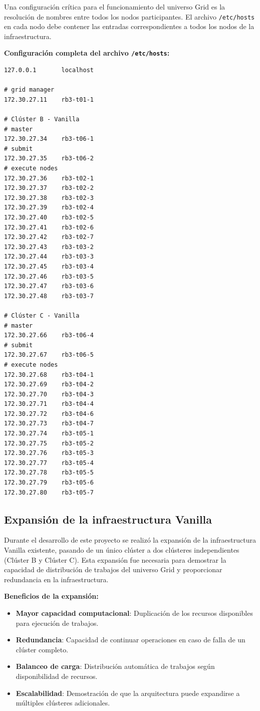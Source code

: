 Una configuración crítica para el funcionamiento del universo Grid es la resolución de nombres entre todos los nodos participantes. El archivo \texttt{/etc/hosts} en cada nodo debe contener las entradas correspondientes a todos los nodos de la infraestructura.

\textbf{Configuración completa del archivo \texttt{/etc/hosts}:}

\begin{verbatim}
127.0.0.1       localhost

# grid manager
172.30.27.11    rb3-t01-1

# Clúster B - Vanilla
# master
172.30.27.34    rb3-t06-1
# submit
172.30.27.35    rb3-t06-2
# execute nodes
172.30.27.36    rb3-t02-1
172.30.27.37    rb3-t02-2
172.30.27.38    rb3-t02-3
172.30.27.39    rb3-t02-4
172.30.27.40    rb3-t02-5
172.30.27.41    rb3-t02-6
172.30.27.42    rb3-t02-7
172.30.27.43    rb3-t03-2
172.30.27.44    rb3-t03-3
172.30.27.45    rb3-t03-4
172.30.27.46    rb3-t03-5
172.30.27.47    rb3-t03-6
172.30.27.48    rb3-t03-7

# Clúster C - Vanilla
# master
172.30.27.66    rb3-t06-4
# submit
172.30.27.67    rb3-t06-5
# execute nodes
172.30.27.68    rb3-t04-1
172.30.27.69    rb3-t04-2
172.30.27.70    rb3-t04-3
172.30.27.71    rb3-t04-4
172.30.27.72    rb3-t04-6
172.30.27.73    rb3-t04-7
172.30.27.74    rb3-t05-1
172.30.27.75    rb3-t05-2
172.30.27.76    rb3-t05-3
172.30.27.77    rb3-t05-4
172.30.27.78    rb3-t05-5
172.30.27.79    rb3-t05-6
172.30.27.80    rb3-t05-7
\end{verbatim}

\FloatBarrier\subsection{Expansión de la infraestructura Vanilla}

Durante el desarrollo de este proyecto se realizó la expansión de la infraestructura Vanilla existente, pasando de un único clúster a dos clústeres independientes (Clúster B y Clúster C). Esta expansión fue necesaria para demostrar la capacidad de distribución de trabajos del universo Grid y proporcionar redundancia en la infraestructura.

\textbf{Beneficios de la expansión:}

\begin{itemize}
	\item \textbf{Mayor capacidad computacional}: Duplicación de los recursos disponibles para ejecución de trabajos.
	
	\item \textbf{Redundancia}: Capacidad de continuar operaciones en caso de falla de un clúster completo.
	
	\item \textbf{Balanceo de carga}: Distribución automática de trabajos según disponibilidad de recursos.
	
	\item \textbf{Escalabilidad}: Demostración de que la arquitectura puede expandirse a múltiples clústeres adicionales.
\end{itemize}

